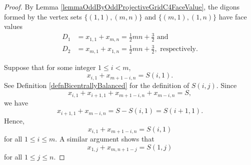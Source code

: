 \documentclass[12pt]{amsart}
\theoremstyle{definition}
\theoremstyle{plain}
\begin{document}
\begin{proof}
By Lemma \ref{lemmaOddByOddProjectiveGridC4FaceValue}, the digons formed by the
vertex sets $\{ (1,1), (m,n)\}$ and $\{(m,1),(1,n)\}$ have face values
\begin{align*}
  D_1 &= x_{1,1} + x_{m,n} = \tfrac{1}{2}mn+ \tfrac{3}{2} \mbox{ and } \\
  D_2 &=  x_{m,1} + x_{1,n} = \tfrac{1}{2}mn+ \tfrac{3}{2}, \mbox{ respectively.}
\end{align*}

Suppose that for some integer $1 \leqslant i < m$,
\begin{equation*}
  x_{i,1} + x_{m+1-i,n} =S(i,1).
\end{equation*}
See Definition \ref{defnBicentrallyBalanced} for the definition of $S(i,j)$.
Since
\begin{equation*}
  x_{i,1} + x_{i+1,1} + x_{m+1-i,n}  + x_{m-i,n} =S,
\end{equation*}
we have
\begin{equation*}
  x_{i+1,1} + x_{m-i,n} =S - S(i,1)= S(i+1,1).
\end{equation*}
Hence,
\begin{equation*}
  x_{i,1} + x_{m+1-i,n} =S(i,1)
\end{equation*}
 for all $1 \leqslant i \leqslant m$.
A similar argument shows that
\begin{equation*}
  x_{1,j} + x_{m,n+1-j} =S(1,j)
\end{equation*}
for all $1 \leqslant j \leqslant n$.


\end{proof}
\end{document}

